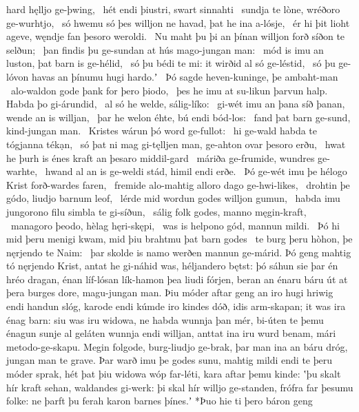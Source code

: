 hard hęlljo ge-þwing, \hld\ hét endi þiustri,
swart sinnahti \hld\ sundja te lòne,
wréðoro ge-wurhtjo, \hld\ só hwemu só þes willjon ne havad,
þat he ina a-lósje, \hld\ ér hi þit lioht ageve,
węndje fan þesoro weroldi. \hld\ Nu maht þu þi an þínan willjon forð
síðon te selðun; \hld\ þan findis þu ge-sundan at hús
mago-jungan man: \hld\ mód is imu an luston,
þat barn is ge-hélid, \hld\ só þu bédi te mi:
it wirðid al só ge-léstid, \hld\ só þu ge-lóvon havas
an þínumu hugi hardo.ʼ \hld\ Þó sagde heven-kuninge,
þe ambaht-man \hld\ alo-waldon gode
þank for þero þiodo, \hld\ þes he imu at su-likun þarvun halp.
Habda þo gi-árundid, \hld\ al só he welde,
sálig-líko: \hld\ gi-wét imu an þana síð þanan,
wende an is willjan, \hld\ þar he welon éhte,
bú endi bód-los: \hld\ fand þat barn ge-sund,
kind-jungan man. \hld\ Kristes wárun þó
word ge-fullot: \hld\ hi ge-wald habda
te tógjanna tékạn, \hld\ só þat ni mag gi-tęlljen man,
ge-ahton ovar þesoro erðu, \hld\ hwat he þurh is énes kraft
an þesaro middil-gard \hld\ máriða ge-frumide,
wundres ge-warhte, \hld\ hwand al an is ge-weldi stád,
himil endi erðe. \hld\ Þó ge-wét imu þe hélogo Krist
forð-wardes faren, \hld\ fremide alo-mahtig
alloro dago ge-hwi-likes, \hld\ drohtin þe gódo,
liudjo barnum leof, \hld\ lérde mid wordun
godes willjon gumun, \hld\ habda imu jungorono filu
simbla te gi-síðun, \hld\ sálig folk godes,
manno męgin-kraft, \hld\ managoro þeodo,
hèlag hęri-skępi, \hld\ was is helpono gód,
mannun mildi. \hld\ Þó hi mid þeru menigi kwam,
mid þiu brahtmu þat barn godes \hld\ te burg þeru hòhon,
þe nęrjendo te Naim: \hld\ þar skolde is namo werðen
mannun ge-márid. \hld\ Þó geng mahtig tó
nęrjendo Krist, \hld\ antat he gi-náhid was,
héljandero bętst: \hld\ þó sáhun sie þar én hréo dragan,
énan líf-lósan lík-hamon \hld\ þea liudi fórjen,
beran an énaru báru \hld\ út at þera burges dore,
magu-jungan man. \hld\ Þiu móder aftar geng
an iro hugi hriwig \hld\ endi handun slóg,
karode endi kúmde \hld\ iro kindes dóð,
idis arm-skapan; \hld\ it was ira énag barn:
siu was iru widowa, \hld\ ne habda wunnja þan mér,
bi-úten te þemu énagun \hld\ sunje al geláten
wunnja endi willjan, \hld\ anttat ina iru wurd benam,
mári metodo-ge-skapu. \hld\ Megin folgode,
burg-liudjo ge-brak, \hld\ þar man ina an báru dróg,
jungan man te grave. \hld\ Þar warð imu þe godes sunu,
mahtig mildi \hld\ endi te þeru móder sprak,
hét þat þiu widowa \hld\ wóp far-léti,
kara aftar þemu kinde: \hld\ ʽþu skalt hír kraft sehan,
waldandes gi-werk: \hld\ þi skal hír willjo ge-standen,
frófra far þesumu folke: \hld\ ne þarft þu ferah karon
barnes þínes.ʼ \hld\ *Þuo hie ti þero báron geng
